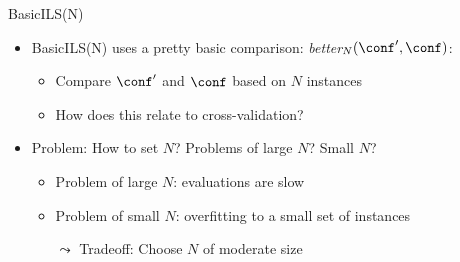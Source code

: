 \begin{frame}[c,fragile]{BasicILS(N)}

\begin{itemize}
  \item \alert{BasicILS(N)} uses a pretty basic comparison: \textit{better$_N(\conf', \conf)$}:
  \begin{itemize}
    \item Compare $\conf'$ and $\conf$ based on $N$ instances 
\pause
	\item How does this relate to cross-validation? \hands
  \end{itemize}  

\bigskip
\pause
    \item Problem: How to set $N$? Problems of large $N$? Small $N$? \hands
    \pause
		\begin{itemize}
			\item Problem of large $N$: evaluations are slow
			\item Problem of small $N$: overfitting to a small set of instances
			\item[$\leadsto$] Tradeoff: Choose $N$ of moderate size 
		\end{itemize}

  \end{itemize}
\end{frame}


